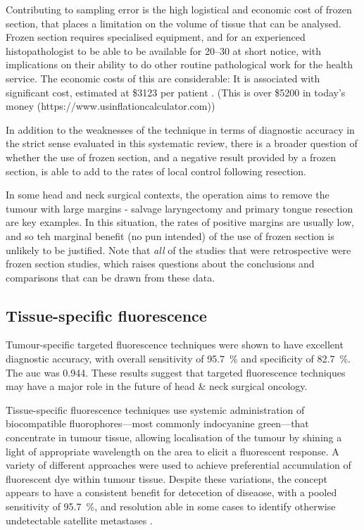 Contributing to sampling error is the high logistical and economic cost of frozen section, that places a limitation on the volume of tissue that can be analysed.
Frozen section requires specialised equipment, and for an experienced histopathologist to be able to be available for \SIrange{20}{30}{\minutes} at short notice, with implications on their ability to do other routine pathological work for the health service. 
The economic costs of this are considerable: 
It is associated with significant cost, estimated at \$3123 per patient \cite{dinardoAccuracyUtilityCost2000}. 
(This is over \$5200 in today's money (https://www.usinflationcalculator.com))

In addition to the weaknesses of the technique in terms of diagnostic accuracy in the strict sense evaluated in this systematic review, there is a broader question of whether the use of frozen section, and a negative result provided by a frozen section, is able to add to the rates of local control following resection.

In some head and neck surgical contexts, the operation aims to remove the tumour with large margins - salvage laryngectomy and primary tongue resection are key examples. 
In this situation, the rates of positive margins are usually low, and so teh marginal benefit (no pun intended) of the use of frozen section is unlikely to be justified.
Note that \emph{all} of the studies that were retrospective were frozen section studies, which raises questions about the conclusions and comparisons that can be drawn from these data.

\subsection{Tissue-specific fluorescence}

Tumour-specific targeted fluorescence techniques were shown to have excellent diagnostic accuracy, with overall sensitivity of \SI{95.7}{\percent} and specificity of \SI{82.7}{\percent}. 
The \gls{auc} was 0.944.
These results suggest that targeted fluorescence techniques may have a major role in the future of head \& neck surgical oncology.

Tissue-specific fluorescence techniques use systemic administration of biocompatible fluorophores---most commonly indocyanine green---that concentrate in tumour tissue, allowing localisation of the tumour  by shining a light of appropriate wavelength on the area to elicit a fluorescent response.
A variety of different approaches were used to achieve preferential accumulation of fluorescent dye within tumour tissue.
Despite these variations, the concept appears to have a consistent benefit for detecetion of diseaose, with a pooled sensitivity of \SI{95.7}{\percent}, and resolution able in some cases to identify otherwise undetectable satellite metastases \cite{voskuilf.j.ImageguidedSurgeryTumor2019}.

